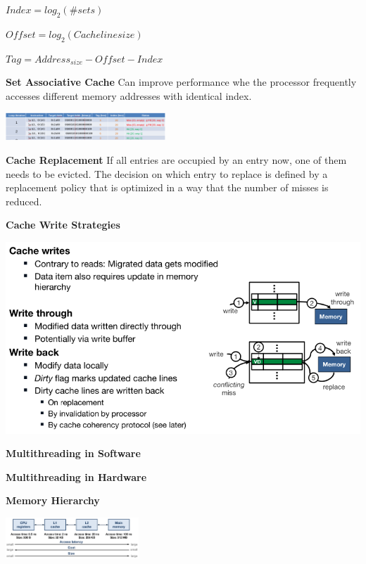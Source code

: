 \documentclass[english]{latex4ei/latex4ei_sheet}
\begin{document}
$Index = log_2(\#sets)$

$Offset = log_2(Cache line size)$

$Tag = Address_{size} - Offset - Index$

\textbf{Set Associative Cache}
Can improve performance whe the processor frequently accesses different memory addresses with identical index.
\begin{center}
	\includegraphics[width = 6cm]{images/4.ProcessorArchitecture/SetAcCache.png}
\end{center}

\textbf{Cache Replacement}
If all entries are occupied by an entry now, one of them needs to be evicted. The decision on which entry to replace is defined by a replacement policy that is optimized in a way that the number of misses is reduced.

\textbf{Cache Write Strategies}

\begin{center}
  \includegraphics[width=\linewidth]{assets/CacheWriteStrategies.png}
  \label{fig:cachewritestrategies}
\end{center}

\textbf{Multithreading in Software}

\textbf{Multithreading in Hardware}



\textbf{Memory Hierarchy}

\begin{center}
	\includegraphics[width = 5cm]{images/4.ProcessorArchitecture/MemoryHierarchy.png}
\end{center}
\end{document}
